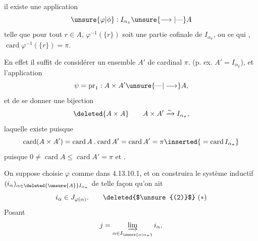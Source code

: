 
il existe une application
\[
\unsure{\varphi|\phi}:I_{\alpha_\pi}\unsure{\longrightarrow|\text{---}}A
\]
telle que pour tout $r\in A$, $\varphi^{-1}(\{r\})$ soit
une partie cofinale de $I_{\alpha_\pi}$, ou ce
qui ,
$\operatorname{card}\varphi^{-1}(\{r\})=\pi$.

En effet il suffit de considérer
un ensemble $A'$ de cardinal $\pi$. (p. ex. $A'=I_{\alpha_\pi}$), et
l'application
\[
\psi=\operatorname{pr}_1:A\times A'\unsure{\text{---}|\longrightarrow}A,
\]
et de se donner une bijection 
\[
\deleted{A\times A}\qquad A\times A'\xrightarrow{\sim}I_{\alpha_\pi},
\]
laquelle existe puisque
\[
\operatorname{card}(A\times A')=\operatorname{card}A\mathbin{.}\operatorname{card}A'=\operatorname{card}A'=\pi\inserted{{}=\operatorname{card}I_{\alpha_\pi}}
\]
puisque $0\neq\operatorname{card}A\leq\operatorname{card}A'=\pi$ et .

 On suppose choisie $\varphi$
comme dans 4.13.10.1, et on 
construira le système inductif
$(i_\alpha)_{\alpha\in\deleted{\unsure{A}}I_{\alpha_\pi}}$ de telle façon qu'on ait
\[
i_\alpha\in J_{\varphi(\alpha)}.\tag*{\deleted{$\unsure{(2)}$} $(*)$}
\]
Posant
\[
j=\varinjlim_{\alpha\in I_{\unsure{\alpha|\alpha_\pi}}}i_\alpha,
\]

